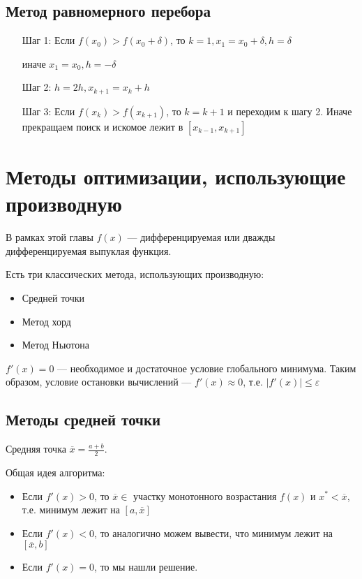 \documentclass[12pt, a4paper, oneside]{book}
\begin{document}
\subsection{Метод равномерного перебора}

\begin{itemize}
    \item [Шаг 1:] Если \(f(x_0) > f(x_0 + \delta)\), то \(k = 1, x_1 = x_0 + \delta, h = \delta\)

          иначе \(x_1 = x_0, h = - \delta\)

    \item [Шаг 2:] \(h = 2h, x_{k+1} = x_k + h\)
    \item [Шаг 3:] Если \(f(x_k) > f(x_{k+1})\), то \(k = k + 1\) и переходим к шагу 2. Иначе прекращаем поиск и искомое лежит в \([x_{k - 1}, x_{k + 1}]\)
\end{itemize}

\section{Методы оптимизации, использующие производную}

В рамках этой главы \(f(x)\) --- дифференцируемая или дважды дифференцируемая выпуклая функция.

Есть три классических метода, использующих производную:
\begin{itemize}
    \item Средней точки
    \item Метод хорд
    \item Метод Ньютона
\end{itemize}

\(f'(x) = 0\) --- необходимое и достаточное условие глобального минимума. Таким образом, условие остановки вычислений --- \(f'(x) \approx 0\), т.е. \(|f'(x)| \leq \varepsilon\)

\subsection{Методы средней точки}

Средняя точка \(\overline x = \frac{a + b}{2}\).

Общая идея алгоритма:
\begin{itemize}
    \item Если \(f'(x) > 0\), то \(\overline x\in\) участку монотонного возрастания \(f(x)\) и \(x^* < \overline x\), т.е. минимум лежит на \([a, \overline x]\)
    \item Если \(f'(x) < 0\), то аналогично можем вывести, что минимум лежит на \([\overline x, b]\)
    \item Если \(f'(x) = 0\), то мы нашли решение.
\end{itemize}
\end{document}
